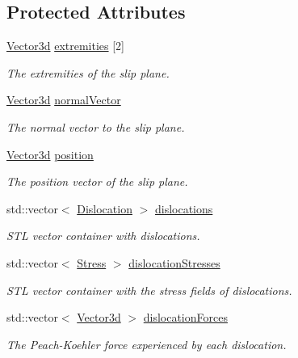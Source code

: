 \subsection*{Protected Attributes}
\begin{DoxyCompactItemize}
\item 
\hyperlink{classVector3d}{Vector3d} \hyperlink{classSlipPlane_a52df6a08ab40ffd0dfb4a467e45d2835}{extremities} \mbox{[}2\mbox{]}
\begin{DoxyCompactList}\small\item\em The extremities of the slip plane. \end{DoxyCompactList}\item 
\hyperlink{classVector3d}{Vector3d} \hyperlink{classSlipPlane_aad33ce7b595e5fc55aefe51c7b0957f2}{normal\-Vector}
\begin{DoxyCompactList}\small\item\em The normal vector to the slip plane. \end{DoxyCompactList}\item 
\hyperlink{classVector3d}{Vector3d} \hyperlink{classSlipPlane_ac2ac59e22e9638a990c9e45aaa096d9a}{position}
\begin{DoxyCompactList}\small\item\em The position vector of the slip plane. \end{DoxyCompactList}\item 
std\-::vector$<$ \hyperlink{classDislocation}{Dislocation} $>$ \hyperlink{classSlipPlane_ad92c7c409f7e161db449528389180910}{dislocations}
\begin{DoxyCompactList}\small\item\em S\-T\-L vector container with dislocations. \end{DoxyCompactList}\item 
std\-::vector$<$ \hyperlink{classStress}{Stress} $>$ \hyperlink{classSlipPlane_adaa1bb736c2912f5e06e7aa4553c1ebd}{dislocation\-Stresses}
\begin{DoxyCompactList}\small\item\em S\-T\-L vector container with the stress fields of dislocations. \end{DoxyCompactList}\item 
std\-::vector$<$ \hyperlink{classVector3d}{Vector3d} $>$ \hyperlink{classSlipPlane_a2a74ae1f66a59e53a3ca0c9b81b28f7d}{dislocation\-Forces}
\begin{DoxyCompactList}\small\item\em The Peach-\/\-Koehler force experienced by each dislocation. \end{DoxyCompactList}\item 

\end{DoxyCompactItemize}
